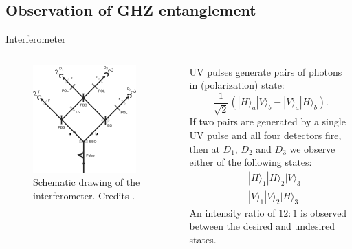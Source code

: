 \documentclass[10pt]{beamer}
\begin{document}
\subsection{Observation of GHZ entanglement}
\begin{frame}{Interferometer}
  \begin{columns}[c]
    \begin{figure}
      \includegraphics[width=0.9\textwidth]{Images/ghz-entanglement'.png}
      \caption{Schematic drawing of the interferometer. Credits \cite{Nature.403.515}.}
    \end{figure}
    UV pulses generate pairs of photons in (polarization) state:
    \begin{equation*}
      \frac{1}{\sqrt{2}} \left( |H\rangle_a |V\rangle_b - |V\rangle_a |H\rangle_b \right).
    \end{equation*}
    If two pairs are generated by a single UV pulse and all four detectors fire, then at $D_1$, $D_2$ and $D_3$ we observe either of the following states:
    \begin{equation*}
      \begin{split}
        &|H\rangle_1 |H\rangle_2 |V\rangle_3\\
        &|V\rangle_1 |V\rangle_2 |H\rangle_3
      \end{split}
    \end{equation*}
    An intensity ratio of $12:1$ is observed between the desired and undesired states.
  \end{columns}
\end{frame}
\end{document}
